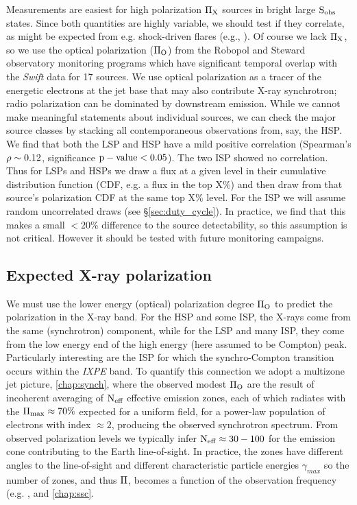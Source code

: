  Measurements are easiest for high polarization $\rm \Pi_X$ sources in bright large $\rm S_{\rm obs}$ states. 
Since both quantities are highly variable, we should test if they correlate, 
as might be expected from e.g. shock-driven flares (e.g., \citealp{marscher_core_2008}). Of course we lack $\rm \Pi_X$,
so we use the optical polarization ($\rm \Pi_O$) from the Robopol and Steward observatory monitoring programs which have significant
temporal overlap with the {\it Swift} data for 17 sources. We use optical polarization as a tracer of the energetic
electrons at the jet base that may also contribute X-ray synchrotron; radio
polarization can be dominated by downstream emission. While we cannot make meaningful statements about individual
sources, we can check the major source classes by stacking all contemporaneous observations from, say, the HSP.
We find that both the LSP and HSP have a mild positive correlation (Spearman's $\rm \rho\sim0.12$, significance $\rm p-value < 0.05$).
The two ISP showed no correlation. Thus for LSPs and HSPs we draw a flux at
a given level in their cumulative distribution function (CDF, e.g. a flux in the top X\%) and then draw from that source's polarization CDF at the same top X\% level. For the ISP we will assume random uncorrelated draws (see \S \ref{sec:duty_cycle}).
In practice, we find that this makes a small $<20$\% difference to the source detectability, so this assumption is not critical. However it should be tested with future monitoring campaigns.


\subsection{Expected X-ray polarization}
\label{sec:xray_predict}

	We must use the lower energy (optical) polarization degree $\rm \Pi_O$  to predict the polarization in
the X-ray band. For the HSP and some ISP, the X-rays come from the same (synchrotron) component,
while for the LSP and many ISP, they come from the low energy end of the high energy (here assumed
to be Compton) peak. Particularly interesting are the ISP for which the synchro-Compton transition
occurs within the {\it IXPE} band.
To quantify this connection we adopt a multizone jet picture, \cref{chap:synch},
where the observed modest $\rm \Pi_O$ are the result of incoherent averaging of $\rm N_{eff}$ effective emission 
zones, each of which radiates with the $\rm \Pi_{max} \approx 70\%$ expected for a uniform field, for a power-law
population of electrons with index $\approx 2$, producing the observed synchrotron spectrum. From observed polarization
levels we typically infer $\rm N_{eff} \approx 30-100$ for the emission cone contributing to the Earth line-of-sight.
In practice, the zones have different angles to the line-of-sight and different characteristic particle energies $\gamma_{max}$
so the number of zones, and thus $\rm \Pi$, becomes a function of the observation frequency 
(e.g. \citealp{marscher_rapid_2010, marscher_turbulent_2014}, and \cref{chap:ssc}. 

